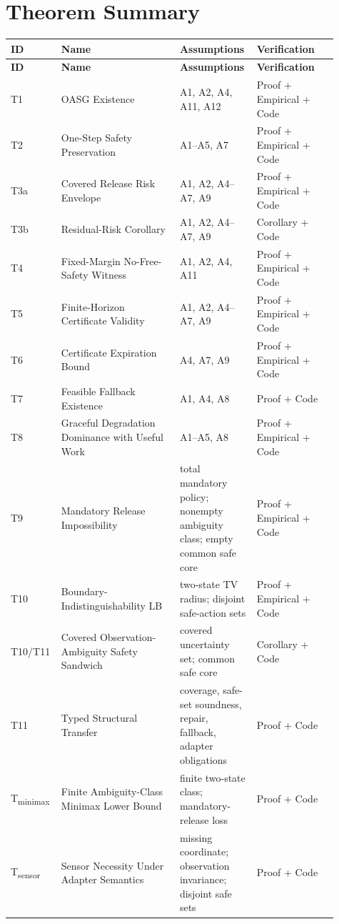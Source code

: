 \section{Theorem Summary}\label{app:theorems}

\small
\begin{longtable}{p{0.10\linewidth}p{0.35\linewidth}p{0.22\linewidth}p{0.24\linewidth}}
\toprule
\textbf{ID} & \textbf{Name} & \textbf{Assumptions} & \textbf{Verification} \\
\midrule
\endfirsthead
\toprule
\textbf{ID} & \textbf{Name} & \textbf{Assumptions} & \textbf{Verification} \\
\midrule
\endhead
T1  & OASG Existence                    & A1, A2, A4, A11, A12 & Proof + Empirical + Code \\
T2  & One-Step Safety Preservation      & A1--A5, A7 & Proof + Empirical + Code \\
T3a & Covered Release Risk Envelope     & A1, A2, A4--A7, A9 & Proof + Empirical + Code \\
T3b & Residual-Risk Corollary           & A1, A2, A4--A7, A9 & Corollary + Code \\
T4  & Fixed-Margin No-Free-Safety Witness & A1, A2, A4, A11 & Proof + Empirical + Code \\
T5  & Finite-Horizon Certificate Validity & A1, A2, A4--A7, A9 & Proof + Empirical + Code \\
T6  & Certificate Expiration Bound      & A4, A7, A9 & Proof + Empirical + Code \\
T7  & Feasible Fallback Existence       & A1, A4, A8 & Proof + Code \\
T8  & Graceful Degradation Dominance with Useful Work & A1--A5, A8 & Proof + Empirical + Code \\
T9  & Mandatory Release Impossibility   & total mandatory policy; nonempty ambiguity class; empty common safe core & Proof + Empirical + Code \\
T10 & Boundary-Indistinguishability LB  & two-state TV radius; disjoint safe-action sets & Proof + Empirical + Code \\
T10/T11 & Covered Observation-Ambiguity Safety Sandwich & covered uncertainty set; common safe core & Corollary + Code \\
T11 & Typed Structural Transfer         & coverage, safe-set soundness, repair, fallback, adapter obligations & Proof + Code \\
T\textsubscript{minimax} & Finite Ambiguity-Class Minimax Lower Bound & finite two-state class; mandatory-release loss & Proof + Code \\
T\textsubscript{sensor} & Sensor Necessity Under Adapter Semantics & missing coordinate; observation invariance; disjoint safe sets & Proof + Code \\
\bottomrule
\end{longtable}
\normalsize

